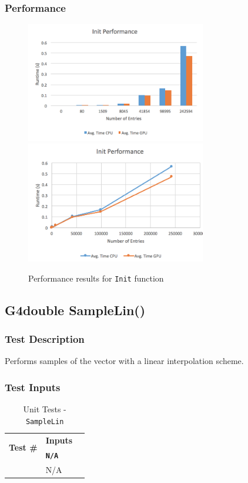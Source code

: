 \documentclass[12pt]{article}
\newcounter{TestCounter}
\begin{document}
	\subsubsection{Performance}
    	\begin{figure}[H]
    	\centering
    	\caption{Performance results for \texttt{Init} function}\label{figPerformanceInit}
    	\includegraphics[width=0.7\textwidth]{init_bar.png}
    	\includegraphics[width=0.7\textwidth]{init_line.png}
    	\end{figure}

\subsection{G4double SampleLin()}%
	\subsubsection{Test Description}
	 Performs samples of the vector with a linear interpolation scheme.
	
	\subsubsection{Test Inputs}
		\begin{table}[H]
		\centering
		\caption{Unit Tests - \texttt{SampleLin}}\label{SampleLin_unit}
		\begin{tabular}{lll}
		\toprule
		\multirow{2}{*}{\bf Test \#}  & \multicolumn{1}{c}{\bf Inputs}\\
		& \bf \texttt{N/A}\\\midrule
		{TestCounter}\arabic{TestCounter}\label{SampleLin_0} & N/A \\
		\bottomrule
		\end{tabular}
		\end{table}
	
\end{document}
